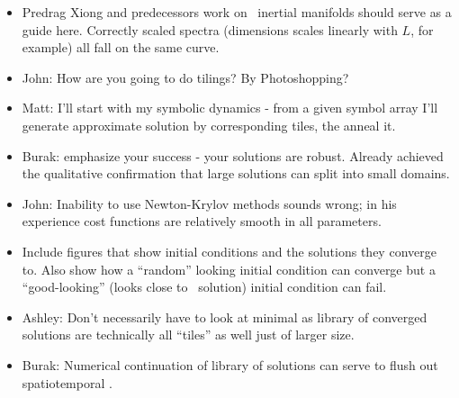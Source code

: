 \begin{description}
{\begin{itemize}
does it have a shoulder, beyond which it fall off exponentially for large frequencies?
  \item Predrag Xiong and predecessors work on \KS\ inertial manifolds should
serve as a guide here. Correctly scaled spectra (dimensions scales linearly with $L$,
for example) all fall on the same curve.
  \item John: How are you going to do tilings? By Photoshopping?
  \item Matt: I'll start with my symbolic dynamics - from a given symbol array I'll
generate approximate solution by corresponding tiles, the anneal it.
  \item Burak: emphasize your success - your solutions are robust. Already achieved
the qualitative confirmation that large solutions can split into small domains.
  \item John: Inability to use Newton-Krylov methods sounds wrong; in his
  experience cost functions are relatively smooth in all parameters.
  \item Include figures that show initial conditions and the solutions
  they converge to. Also show how a ``random'' looking initial condition
  can converge but a ``good-looking'' (looks close to \KS\ solution)
  initial condition can fail.
  \item Ashley: Don't necessarily have to look at minimal {\twots} as library of converged solutions are technically all
  ``tiles'' as well just of larger size.
  \item Burak: Numerical continuation of library of solutions can serve
  to flush out spatiotemporal \twots.
\end{itemize}
}



\end{description}
